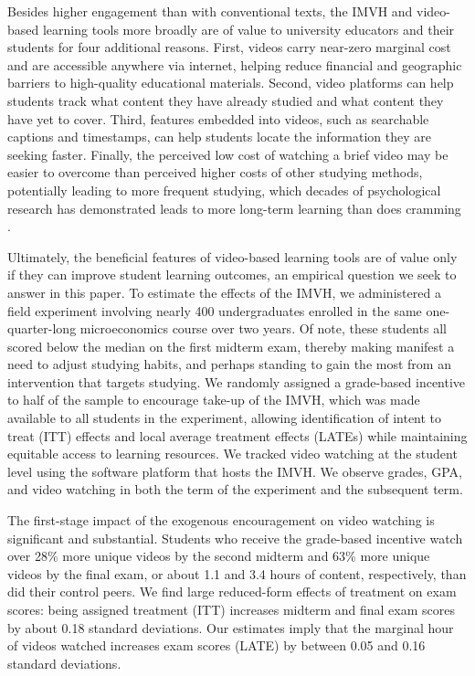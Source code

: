 \documentclass[12pt]{article}
\begin{document}
Besides higher engagement than with conventional texts, the IMVH and video-based learning tools more broadly are of value to university educators and their students for four additional reasons. First, videos carry near-zero marginal cost and are accessible anywhere via internet, helping reduce financial and geographic barriers to high-quality educational materials. Second, video platforms can help students track what content they have already studied and what content they have yet to cover. Third, features embedded into videos, such as searchable captions and timestamps, can help students locate the information they are seeking faster. Finally, the perceived low cost of watching a brief video may be easier to overcome than perceived higher costs of other studying methods, potentially leading to more frequent studying, which decades of psychological research has demonstrated leads to more long-term learning than does cramming \parencite{kornell2009, cpvw2006}.

Ultimately, the beneficial features of video-based learning tools are of value only if they can improve student learning outcomes, an empirical question we seek to answer in this paper. To estimate the effects of the IMVH, we administered a field experiment involving nearly 400 undergraduates enrolled in the same one-quarter-long microeconomics course over two years. Of note, these students all scored below the median on the first midterm exam, thereby making manifest a need to adjust studying habits, and perhaps standing to gain the most from an intervention that targets studying. We randomly assigned a grade-based incentive to half of the sample to encourage take-up of the IMVH, which was made available to all students in the experiment, allowing identification of intent to treat (ITT) effects and local average treatment effects (LATEs) while maintaining equitable access to learning resources. We tracked video watching at the student level using the software platform that hosts the IMVH. We observe grades, GPA, and video watching in both the term of the experiment and the subsequent term.

The first-stage impact of the exogenous encouragement on video watching is significant and substantial. Students who receive the grade-based incentive watch over 28\% more unique videos by the second midterm and 63\% more unique videos by the final exam, or about 1.1 and 3.4 hours of content, respectively, than did their control peers. We find large reduced-form effects of treatment on exam scores: being assigned treatment (ITT) increases midterm and final exam scores by about 0.18 standard deviations. Our estimates imply that the marginal hour of videos watched increases exam scores (LATE) by between 0.05 and 0.16 standard deviations.
\end{document}
